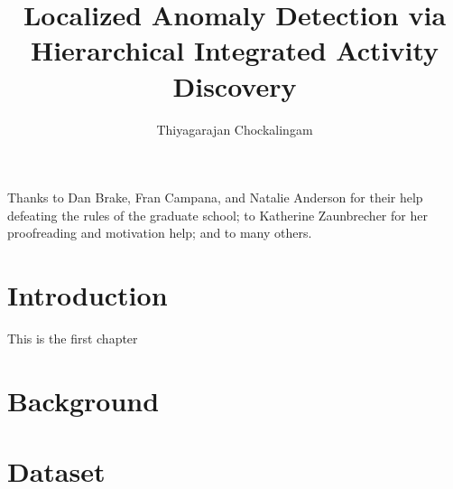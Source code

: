 \documentclass[reqno]{csuthesis}
\title[Improved temporal patterns]{Localized Anomaly Detection via Hierarchical Integrated Activity Discovery
}
\author{Thiyagarajan Chockalingam}
\begin{document}
\newcommand\addtag{\refstepcounter{equation}\tag{\theequation}}
\frontmatter
\begin{abstract}

\end{abstract}



\begin{acknowledgements}
Thanks to Dan Brake, Fran Campana, and Natalie Anderson for their help defeating the rules of the graduate school; to Katherine Zaunbrecher for her proofreading and motivation help; and to many others.
\end{acknowledgements}%

\maketitle


\tableofcontents %
\listoftables %
\listoffigures %

\mainmatter %
\chapter{Introduction}
This is the first chapter
\chapter{Background}

\chapter{Dataset}
\end{document}
